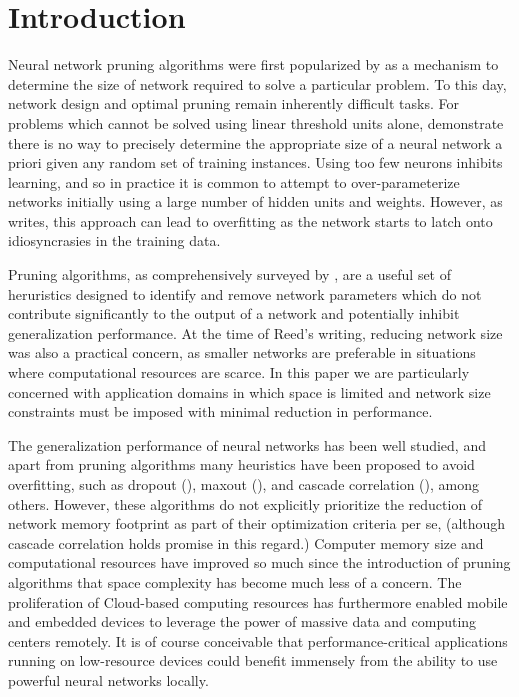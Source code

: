 \section{Introduction}
Neural network pruning algorithms were first popularized by \cite{sietsma1988neural} as a mechanism to determine the size of network required to solve a particular problem. To this day, network design and optimal pruning remain inherently difficult tasks. For problems which cannot be solved using linear threshold units alone, \cite{baum1989size} demonstrate there is no way to precisely determine the appropriate size of a neural network a priori given any random set of training instances. Using too few neurons inhibits learning, and so in practice it is common to attempt to over-parameterize networks initially using a large number of hidden units and weights. However, as \cite{chauvin1990generalization} writes, this approach can lead to overfitting as the network starts to latch onto idiosyncrasies in the training data. 


Pruning algorithms, as comprehensively surveyed by \cite{reed1993pruning}, are a useful set of heruristics designed to identify and remove network parameters which do not contribute significantly to the output of a network and potentially inhibit generalization performance. At the time of Reed's writing, reducing network size was also a practical concern, as smaller networks are preferable in situations where computational resources are scarce. In this paper we are particularly concerned with application domains in which space is limited and network size constraints must be imposed with minimal reduction in performance.


The generalization performance of neural networks has been well studied, and apart from pruning algorithms many heuristics have been proposed to avoid overfitting, such as dropout (\cite{srivastava2014dropout}), maxout (\cite{goodfellow2013maxout}), and cascade correlation (\cite{fahlman1989cascade}), among others. However, these algorithms do not explicitly prioritize the reduction of network memory footprint as part of their optimization criteria per se, (although cascade correlation holds promise in this regard.) Computer memory size and computational resources have improved so much since the introduction of pruning algorithms that space complexity has become much less of a concern. The proliferation of Cloud-based computing resources has furthermore enabled mobile and embedded devices to leverage the power of massive data and computing centers remotely. It is of course conceivable that performance-critical applications running on low-resource devices could benefit immensely from the ability to use powerful neural networks locally. 


